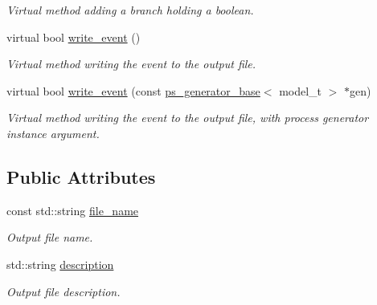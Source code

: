 \begin{DoxyCompactItemize}
\begin{DoxyCompactList}\small\item\em Virtual method adding a branch holding a boolean. \end{DoxyCompactList}\item 
\hypertarget{a00319_a75ec56db0587a4d62a8831cdb80248a5}{}virtual bool \hyperlink{a00319_a75ec56db0587a4d62a8831cdb80248a5}{write\+\_\+event} ()\label{a00319_a75ec56db0587a4d62a8831cdb80248a5}

\begin{DoxyCompactList}\small\item\em Virtual method writing the event to the output file. \end{DoxyCompactList}\item 
virtual bool \hyperlink{a00319_ac94d8fdd89e311ce7fef48a3eacc2dc5}{write\+\_\+event} (const \hyperlink{a00451}{ps\+\_\+generator\+\_\+base}$<$ model\+\_\+t $>$ $\ast$gen)
\begin{DoxyCompactList}\small\item\em Virtual method writing the event to the output file, with process generator instance argument. \end{DoxyCompactList}\end{DoxyCompactItemize}
\subsection*{Public Attributes}
\begin{DoxyCompactItemize}
\item 
\hypertarget{a00319_adcc7d26eacb87b67d0c4b160fffeacd4}{}const std\+::string \hyperlink{a00319_adcc7d26eacb87b67d0c4b160fffeacd4}{file\+\_\+name}\label{a00319_adcc7d26eacb87b67d0c4b160fffeacd4}

\begin{DoxyCompactList}\small\item\em Output file name. \end{DoxyCompactList}\item 
\hypertarget{a00319_a366c2b2cfaa58182e2feebc1c30ce94c}{}std\+::string \hyperlink{a00319_a366c2b2cfaa58182e2feebc1c30ce94c}{description}\label{a00319_a366c2b2cfaa58182e2feebc1c30ce94c}

\begin{DoxyCompactList}\small\item\em Output file description. \end{DoxyCompactList}\end{DoxyCompactItemize}



